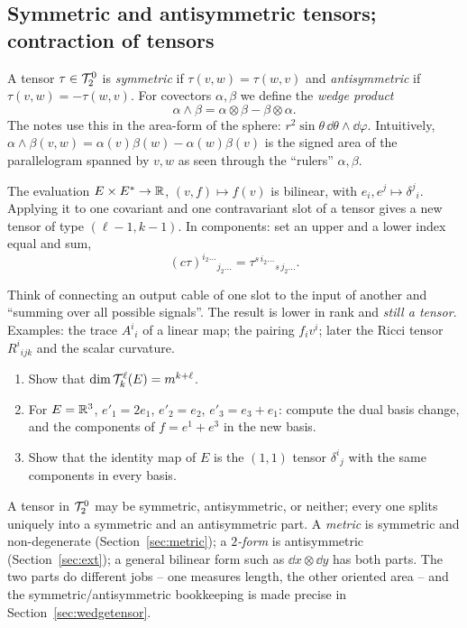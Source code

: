 \subsection{Symmetric and antisymmetric tensors; contraction of tensors}\label{sec:symcontr}
A tensor $\tau\in\mathcal{T}^{0}_{2}$ is \emph{symmetric} if $\tau(v,w)=\tau(w,v)$ and \emph{antisymmetric} if $\tau(v,w)=-\tau(w,v)$. For covectors $\alpha,\beta$ we define the \emph{wedge product}
\[
\alpha\wedge\beta=\alpha\otimes\beta-\beta\otimes\alpha.
\]
The notes use this in the area-form of the sphere: $r^2\sin\theta\,\dd\theta\wedge\dd\varphi$. Intuitively, $\alpha\wedge\beta(v,w)=\alpha(v)\beta(w)-\alpha(w)\beta(v)$ is the signed area of the parallelogram spanned by $v,w$ as seen through the ``rulers'' $\alpha,\beta$.

\begin{formal}[{contraction}]
The evaluation $E\times E^*\to\mathbb{R}$, $(v,f)\mapsto f(v)$ is bilinear, with $e_i,e^{j}\mapsto\delta^j{}_i$. Applying it to one covariant and one contravariant slot of a tensor gives a new tensor of type $(\ell-1,k-1)$. In components: set an upper and a lower index equal and sum,
\[
(c\tau)^{i_2\dots}{}_{j_2\dots}=\tau^{s\,i_2\dots}{}_{s\,j_2\dots}.
\]
\end{formal}
\begin{intuition}[{contraction = plug a vector-slot into a covector-slot}]
Think of connecting an output cable of one slot to the input of another and ``summing over all possible signals''. The result is lower in rank and \emph{still a tensor}. Examples: the trace $A^i{}_i$ of a linear map; the pairing $f_iv^i$; later the Ricci tensor $R^i{}_{ijk}$ and the scalar curvature.
\end{intuition}

\begin{exercises}
\begin{enumerate}[nosep]
\item Show that $\dim\mathcal{T}^{\ell}_{k}(E)=m^{k+\ell}$.
\item For $E=\mathbb{R}^3$, $e'_1=2e_1$, $e'_2=e_2$, $e'_3=e_3+e_1$: compute the dual basis change, and the components of $f=e^{1}+e^{3}$ in the new basis.
\item Show that the identity map of $E$ is the $(1,1)$ tensor $\delta^i{}_j$ with the same components in every basis.
\end{enumerate}
\end{exercises}


\begin{remark}
A tensor in $\mathcal{T}^{0}_{2}$ may be symmetric, antisymmetric, or neither; every one splits uniquely into a symmetric and an
antisymmetric part. A \emph{metric} is symmetric and non-degenerate (Section~\ref{sec:metric}); a \emph{$2$-form} is
antisymmetric (Section~\ref{sec:ext}); a general bilinear form such as $\dd x\otimes\dd y$ has both parts. The two parts
do different jobs -- one measures length, the other oriented area -- and the symmetric/antisymmetric bookkeeping
is made precise in Section~\ref{sec:wedgetensor}.
\end{remark}
